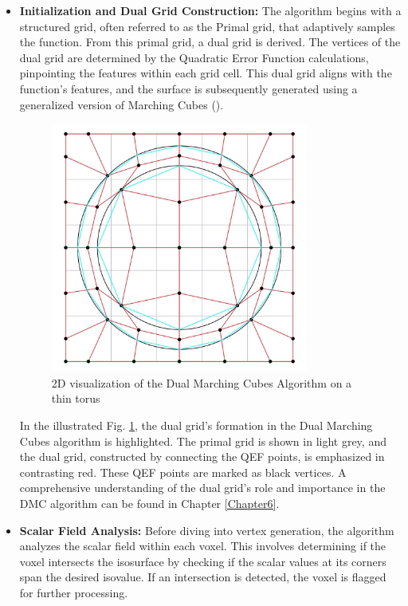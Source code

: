 \begin{itemize}
\item \textbf{Initialization and Dual Grid Construction:}
The algorithm begins with a structured grid, often referred to as the Primal grid, that adaptively samples the function. From this primal grid, a dual grid is derived. The vertices of the dual grid are determined by the Quadratic Error Function calculations, pinpointing the features within each grid cell. This dual grid aligns with the function's features, and the surface is subsequently generated using a generalized version of Marching Cubes (\cite{Schaefer_2004}).

\begin{figure}[H]
\centering
\includegraphics[height=0.75\textwidth,width=0.8\textwidth]{Figures/DMC-dual-grid.jpg}
\decoRule
\caption{2D visualization of the Dual Marching Cubes Algorithm on a thin torus}
\label{fig:DMC-dual-grid-ex}
\end{figure}

In the illustrated Fig. \ref{fig:DMC-dual-grid-ex}, the dual grid's formation in the Dual Marching Cubes algorithm is highlighted. The primal grid is shown in light grey, and the dual grid, constructed by connecting the QEF points, is emphasized in contrasting red. These QEF points are marked as black vertices. A comprehensive understanding of the dual grid's role and importance in the DMC algorithm can be found in Chapter \ref{Chapter6}.

\item \textbf{Scalar Field Analysis:}
Before diving into vertex generation, the algorithm analyzes the scalar field within each voxel. This involves determining if the voxel intersects the isosurface by checking if the scalar values at its corners span the desired isovalue. If an intersection is detected, the voxel is flagged for further processing.


\end{itemize}
